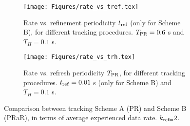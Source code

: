 \documentclass[conference]{IEEEtran}
\newlength\fheight
\newlength\fwidth
\newif\iftikz
\begin{document}
\begin{figure*}[t]
	\centering
	\begin{subfigure}[t]{0.45\textwidth}
		\setlength{\belowcaptionskip}{0cm}
		\iftikz
		\setlength{\belowcaptionskip}{0cm}
		\setlength\fwidth{0.83\textwidth}
		\setlength\fheight{0.41\textwidth}
		
		\else
		\texttt{[image: Figures/rate\_vs\_tref.tex]}
		\fi
		\caption{Rate vs. refinement periodicity $t_{\rm ref}$ (only for Scheme B), for different tracking procedures. $T_{\rm PR} = 0.6$ s and $T_{H} = 0.1$ s. }
			\label{fig:rate_vs_tref}
	\end{subfigure}
	\quad \quad
	\begin{subfigure}[t]{0.45\textwidth}
		\setlength{\belowcaptionskip}{0cm}
		\iftikz
		\setlength{\belowcaptionskip}{0cm}
		\setlength\fwidth{0.83\textwidth}
		\setlength\fheight{0.41\textwidth}
		
		\else
		\texttt{[image: Figures/rate\_vs\_trh.tex]}
		\fi
		\caption{Rate vs. refresh periodicity $T_{\rm PR}$, for different tracking procedures. $t_{\rm ref} =0.01$ s (only for Scheme B) and $T_{H} = 0.1$ s. } 
			\label{fig:rate_vs_trh}
	\end{subfigure}
	\caption{Comparison between tracking Scheme A (PR) and Scheme B (PRaR), in terms of average experienced data rate. $k_{\rm ref=}2$.}

	\label{fig:rate_vs_t} 
\end{figure*}
\end{document}
